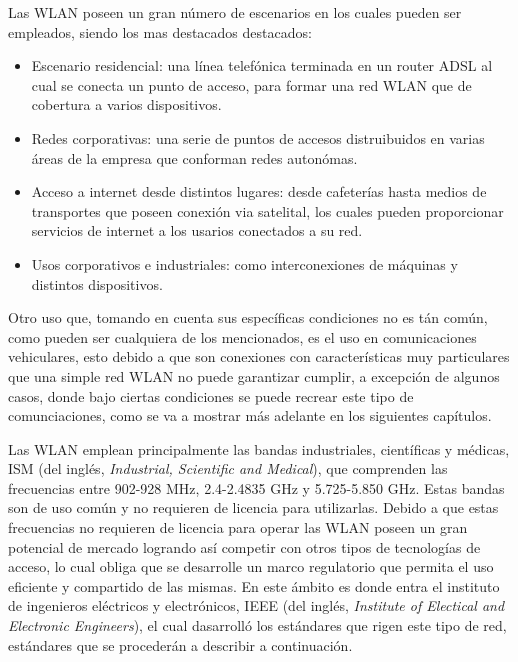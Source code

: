 Las WLAN poseen un gran número de escenarios en los cuales pueden ser empleados, siendo los mas destacados destacados:\\

\begin{itemize}
	\item Escenario residencial: una línea telefónica terminada en un router ADSL al cual se conecta un punto de acceso, para formar una red WLAN que de cobertura a varios dispositivos.
	\item Redes corporativas: una serie de puntos de accesos distruibuidos en varias áreas de la empresa que conforman redes autonómas.
	\item Acceso a internet desde distintos lugares: desde cafeterías hasta medios de transportes que poseen conexión via satelital, los cuales pueden proporcionar servicios de internet a los usarios conectados a su red.
	\item Usos corporativos e industriales: como interconexiones de máquinas y distintos dispositivos.   
\end{itemize}

\par Otro uso que, tomando en cuenta sus específicas condiciones no es tán común, como pueden ser cualquiera de los mencionados, es el uso en comunicaciones vehiculares, esto debido a que son conexiones con características muy particulares que una simple red WLAN no puede garantizar cumplir, a excepción de algunos casos, donde bajo ciertas condiciones se puede recrear este tipo de comunciaciones, como se va a mostrar más adelante en los siguientes capítulos.\\    

\par Las WLAN emplean principalmente las bandas industriales, científicas y médicas, ISM (del inglés, \textit{Industrial, Scientific and Medical}), que comprenden las frecuencias entre 902-928 MHz, 2.4-2.4835 GHz y 5.725-5.850 GHz. Estas bandas son de uso común y no requieren de licencia para utilizarlas. Debido a que estas frecuencias no requieren de licencia para operar las WLAN poseen un gran potencial de mercado logrando así competir con otros tipos de tecnologías de acceso, lo cual obliga que se desarrolle un marco regulatorio que permita el uso eficiente y compartido de las mismas. En este ámbito es donde entra el instituto de ingenieros eléctricos y electrónicos, IEEE (del inglés, \textit{Institute of Electical and Electronic Engineers}), el cual dasarrolló los estándares que rigen este tipo de red, estándares que se procederán a describir a continuación.

